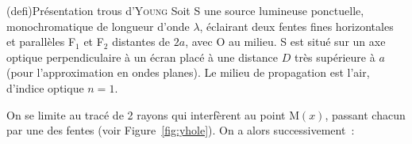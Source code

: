 \documentclass[../../main/main.tex]{subfiles}
\begin{document}
\begin{tcb*}[breakable](defi){Présentation trous d'\textsc{Young}}
	Soit S une source lumineuse ponctuelle, monochromatique de longueur d'onde
	$\lambda$, éclairant deux fentes fines horizontales et parallèles F$_1$ et
	F$_2$ distantes de $2a$, avec O au milieu. S est situé sur un axe optique
	perpendiculaire à un écran placé à une distance $D$ très supérieure à $a$
	(pour l'approximation en ondes planes). Le milieu de propagation est l'air,
	d'indice optique $n=1$.
	\begin{center}
		\label{fig:yhole}
	\end{center}
\end{tcb*}
On se limite au tracé de 2 rayons qui interfèrent au point M$(x)$, passant
chacun par une des fentes (voir Figure~\ref{fig:yhole}). On a alors
successivement~:
\end{document}
